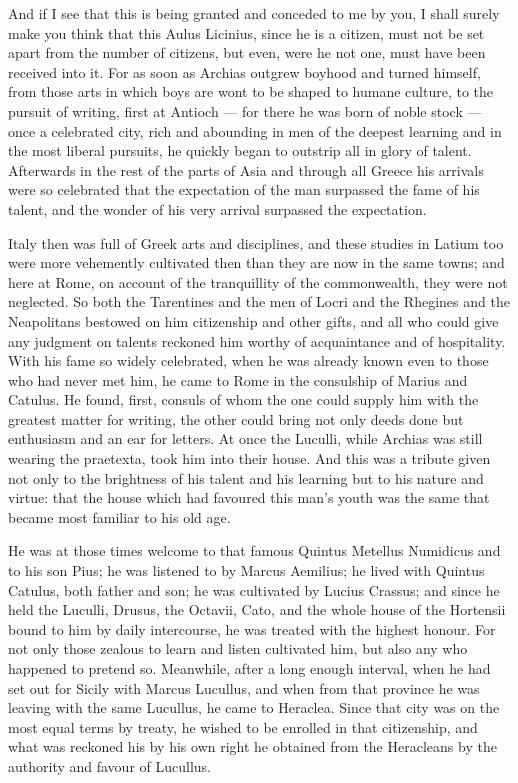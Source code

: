  And if I see that this is being granted and conceded to me by you, I shall surely make you think that this Aulus Licinius, since he is a citizen, must not be set apart from the number of citizens, but even, were he not one, must have been received into it. For as soon as Archias outgrew boyhood and turned himself, from those arts in which boys are wont to be shaped to humane culture, to the pursuit of writing, first at Antioch --- for there he was born of noble stock --- once a celebrated city, rich and abounding in men of the deepest learning and in the most liberal pursuits, he quickly began to outstrip all in glory of talent. Afterwards in the rest of the parts of Asia and through all Greece his arrivals were so celebrated that the expectation of the man surpassed the fame of his talent, and the wonder of his very arrival surpassed the expectation.

 Italy then was full of Greek arts and disciplines, and these studies in Latium too were more vehemently cultivated then than they are now in the same towns; and here at Rome, on account of the tranquillity of the commonwealth, they were not neglected. So both the Tarentines and the men of Locri and the Rhegines and the Neapolitans bestowed on him citizenship and other gifts, and all who could give any judgment on talents reckoned him worthy of acquaintance and of hospitality. With his fame so widely celebrated, when he was already known even to those who had never met him, he came to Rome in the consulship of Marius and Catulus. He found, first, consuls of whom the one could supply him with the greatest matter for writing, the other could bring not only deeds done but enthusiasm and an ear for letters. At once the Luculli, while Archias was still wearing the praetexta, took him into their house. And this was a tribute given not only to the brightness of his talent and his learning but to his nature and virtue: that the house which had favoured this man's youth was the same that became most familiar to his old age.

 He was at those times welcome to that famous Quintus Metellus Numidicus and to his son Pius; he was listened to by Marcus Aemilius; he lived with Quintus Catulus, both father and son; he was cultivated by Lucius Crassus; and since he held the Luculli, Drusus, the Octavii, Cato, and the whole house of the Hortensii bound to him by daily intercourse, he was treated with the highest honour. For not only those zealous to learn and listen cultivated him, but also any who happened to pretend so. Meanwhile, after a long enough interval, when he had set out for Sicily with Marcus Lucullus, and when from that province he was leaving with the same Lucullus, he came to Heraclea. Since that city was on the most equal terms by treaty, he wished to be enrolled in that citizenship, and what was reckoned his by his own right he obtained from the Heracleans by the authority and favour of Lucullus.

